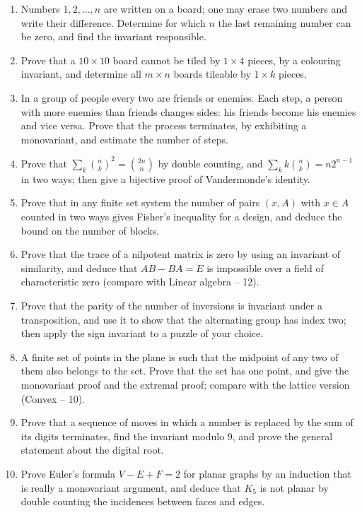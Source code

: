 \documentclass[11pt,a4paper]{article}
\begin{document}
\begin{enumerate}[itemsep=0.4em,topsep=7.4pt]
\item Numbers $1,2,\dots,n$ are written on a board; one may erase two numbers and write their
difference. Determine for which $n$ the last remaining number can be zero, and find the invariant
responsible.

\item Prove that a $10{\times}10$ board cannot be tiled by $1{\times}4$ pieces, by a colouring
invariant, and determine all $m\times n$ boards tileable by $1\times k$ pieces.

\item In a group of people every two are friends or enemies. Each step, a person with more
enemies than friends changes sides: his friends become his enemies and vice versa. Prove that the process terminates, by exhibiting a monovariant, and estimate the
number of steps.

\item Prove that $\sum_k\binom nk^2=\binom{2n}n$ by double counting, and
$\sum_kk\binom nk=n2^{n-1}$ in two ways; then give a bijective proof of Vandermonde's identity.

\item Prove that in any finite set system the number of pairs $(x,A)$ with $x\in A$ counted in two
ways gives Fisher's inequality for a design, and deduce the bound on the number of blocks.

\item Prove that the trace of a nilpotent matrix is zero by using an invariant of similarity, and
deduce that $AB-BA=E$ is impossible over a field of characteristic zero (compare with Linear
algebra -- 12).

\item Prove that the parity of the number of inversions is invariant under a transposition, and
use it to show that the alternating group has index two; then apply the sign invariant to a
puzzle of your choice.

\item A finite set of points in the plane is such that the midpoint of any two of them also
belongs to the set. Prove that the set has one point, and give the monovariant proof and the
extremal proof; compare with the lattice version (Convex -- 10).

\item Prove that a sequence of moves in which a number is replaced by the sum of its digits
terminates, find the invariant modulo $9$, and prove the general statement about the digital root.

\item Prove Euler's formula $V-E+F=2$ for planar graphs by an induction that is really a
monovariant argument, and deduce that $K_5$ is not planar by double counting the incidences
between faces and edges.
\end{enumerate}
\end{document}
